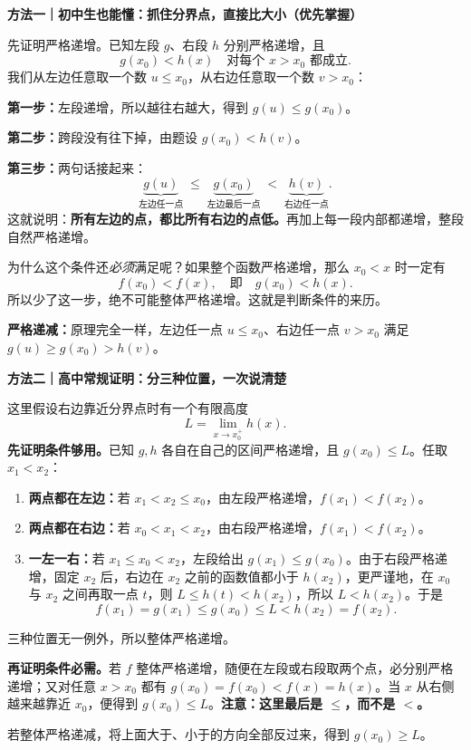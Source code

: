 \begin{proofbox}
\textbf{\textcolor{CProof}{方法一｜初中生也能懂：抓住分界点，直接比大小（优先掌握）}}



先证明严格递增。已知左段 $g$、右段 $h$ 分别严格递增，且
\[
 g(x_0)<h(x)\quad\text{对每个 }x>x_0\text{ 都成立}.
\]
我们从左边任意取一个数 $u\le x_0$，从右边任意取一个数 $v>x_0$：

\textbf{第一步：}左段递增，所以越往右越大，得到 $g(u)\le g(x_0)$。

\textbf{第二步：}跨段没有往下掉，由题设 $g(x_0)<h(v)$。

\textbf{第三步：}两句话接起来：
\[
 \underbrace{g(u)}_{\text{左边任一点}}
 \;\le\;\underbrace{g(x_0)}_{\text{左边最后一点}}
 \;<\;\underbrace{h(v)}_{\text{右边任一点}}.
\]
这就说明：\textbf{所有左边的点，都比所有右边的点低。}再加上每一段内部都递增，整段自然严格递增。

为什么这个条件还\emph{必须}满足呢？如果整个函数严格递增，那么 $x_0<x$ 时一定有
\[
 f(x_0)<f(x),\quad\text{即}\quad g(x_0)<h(x).
\]
所以少了这一步，绝不可能整体严格递增。这就是判断条件的来历。

\textbf{严格递减：}原理完全一样，左边任一点 $u\le x_0$、右边任一点 $v>x_0$ 满足 $g(u)\ge g(x_0)>h(v)$。

\medskip
\end{proofbox}
\clearpage
\begin{proofbox}
\textbf{\textcolor{CProof}{方法二｜高中常规证明：分三种位置，一次说清楚}}



这里假设右边靠近分界点时有一个有限高度
\[
 L=\lim_{x\to x_0^+}h(x).
\]
\textbf{先证明条件够用。}已知 $g,h$ 各自在自己的区间严格递增，且 $g(x_0)\le L$。任取 $x_1<x_2$：
\begin{enumerate}[leftmargin=*,itemsep=0.4em]
\item \textbf{两点都在左边：}若 $x_1<x_2\le x_0$，由左段严格递增，$f(x_1)<f(x_2)$。
\item \textbf{两点都在右边：}若 $x_0<x_1<x_2$，由右段严格递增，$f(x_1)<f(x_2)$。
\item \textbf{一左一右：}若 $x_1\le x_0<x_2$，左段给出 $g(x_1)\le g(x_0)$。由于右段严格递增，固定 $x_2$ 后，右边在 $x_2$ 之前的函数值都小于 $h(x_2)$，更严谨地，在 $x_0$ 与 $x_2$ 之间再取一点 $t$，则 $L\le h(t)<h(x_2)$，所以 $L<h(x_2)$。于是
\[
 f(x_1)=g(x_1)\le g(x_0)\le L<h(x_2)=f(x_2).
\]
\end{enumerate}
三种位置无一例外，所以整体严格递增。

\textbf{再证明条件必需。}若 $f$ 整体严格递增，随便在左段或右段取两个点，必分别严格递增；又对任意 $x>x_0$ 都有 $g(x_0)=f(x_0)<f(x)=h(x)$。当 $x$ 从右侧越来越靠近 $x_0$，便得到 $g(x_0)\le L$。\textbf{注意：这里最后是 $\le$，而不是 $<$。}

若整体严格递减，将上面大于、小于的方向全部反过来，得到 $g(x_0)\ge L$。

\medskip
\end{proofbox}
